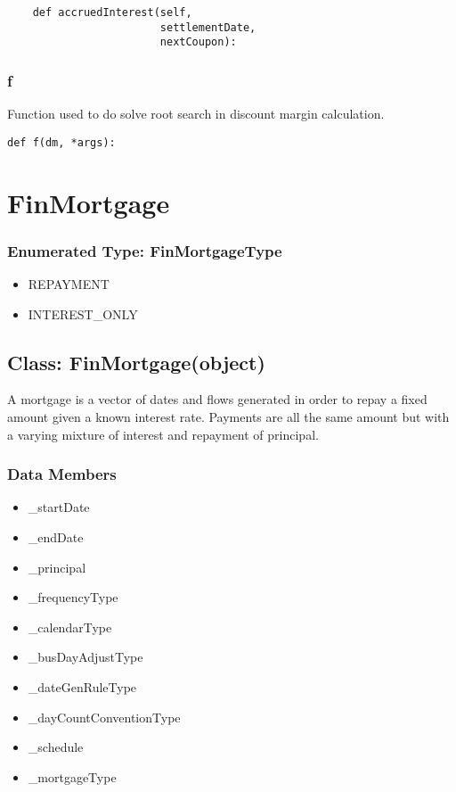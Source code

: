 \documentclass[twoside,11pt]{book}
\begin{document}
\begin{lstlisting}
    def accruedInterest(self,
                        settlementDate,
                        nextCoupon):
\end{lstlisting}

\subsubsection*{{\bf f}}
Function used to do solve root search in discount margin calculation.  

\begin{lstlisting}
def f(dm, *args):
\end{lstlisting}

\newpage
\section{FinMortgage}

\subsubsection{Enumerated Type: FinMortgageType}
\begin{itemize}
\item{REPAYMENT}
\item{INTEREST\_ONLY}
\end{itemize}

\subsection*{Class: FinMortgage(object)}
A mortgage is a vector of dates and flows generated in order to repay a fixed amount given a known interest rate. Payments are all the same amount but with a varying mixture of interest and repayment of principal.  

\subsubsection*{Data Members}
\begin{itemize}
\item{\_startDate}
\item{\_endDate}
\item{\_principal}
\item{\_frequencyType}
\item{\_calendarType}
\item{\_busDayAdjustType}
\item{\_dateGenRuleType}
\item{\_dayCountConventionType}
\item{\_schedule}
\item{\_mortgageType}
\end{itemize}
\end{document}
